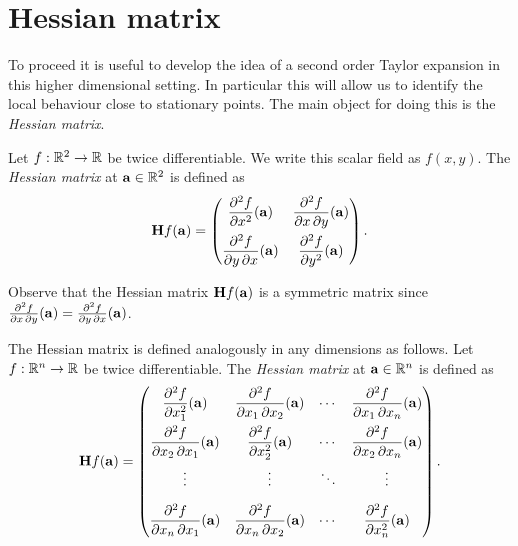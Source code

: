 \section{Hessian matrix}

To proceed it is useful to develop the idea of a second order Taylor expansion in this higher dimensional setting.
In particular this will allow us to identify the local behaviour close to stationary points.
The main object for doing this is the \emph{Hessian matrix}.

\begin{definition}
    Let \(f:\bR^2 \to\bR\) be twice differentiable.
    We write this scalar field as \(f(x,y)\).
    The \emph{Hessian matrix} at \(\aa\in \bR^2\) is defined as
    \[
        \mathbf{H} f (\aa)= \begin{pmatrix}
            \dfrac{\partial^2 f}{\partial x^2} (\aa)
             & \dfrac{\partial^2 f}{\partial x\,\partial y} (\aa)
            \\[2.2ex]
            \dfrac{\partial^2 f}{\partial y\,\partial x} (\aa)
             & \dfrac{\partial^2 f}{\partial y^2}(\aa)
        \end{pmatrix}.
    \]
\end{definition}

Observe that the Hessian matrix \(\mathbf{H} f (\aa)\) is a symmetric matrix since \(\frac{\partial^2 f}{\partial x\,\partial y} (\aa) = \frac{\partial^2 f}{\partial y\,\partial x} (\aa)\).

The Hessian matrix is defined analogously in any dimensions as follows.
Let \(f:\bR^n \to\bR\) be twice differentiable.
The \emph{Hessian matrix} at \(\aa\in \bR^n\) is defined as
\[
    \mathbf{H} f (\aa)= \begin{pmatrix}
        \dfrac{\partial^2 f}{\partial x_1^2} (\aa)
         & \dfrac{\partial^2 f}{\partial x_1\,\partial x_2} (\aa)
         & \cdots
         & \dfrac{\partial^2 f}{\partial x_1\,\partial x_n}(\aa)  \\[2.2ex]
        \dfrac{\partial^2 f}{\partial x_2\,\partial x_1} (\aa)
         & \dfrac{\partial^2 f}{\partial x_2^2}(\aa)
         & \cdots
         & \dfrac{\partial^2 f}{\partial x_2\,\partial x_n}(\aa)  \\[2.2ex]
        \vdots
         & \vdots
         & \ddots
         & \vdots                                                 \\[2.2ex]
        \dfrac{\partial^2 f}{\partial x_n\,\partial x_1} (\aa)
         & \dfrac{\partial^2 f}{\partial x_n\,\partial x_2} (\aa)
         & \cdots
         & \dfrac{\partial^2 f}{\partial x_n^2}(\aa)
    \end{pmatrix}.
\]

